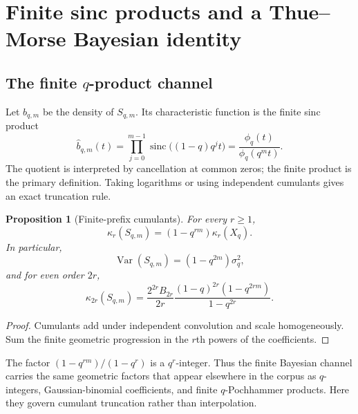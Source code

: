 \documentclass[11pt,oneside]{article}
\newtheorem{proposition}[theorem]{Proposition}
\theoremstyle{definition}
\theoremstyle{remark}
\newcommand{\Var}{\operatorname{Var}}
\newcommand{\sinc}{\operatorname{sinc}}
\begin{document}
\section{Finite sinc products and a Thue--Morse Bayesian identity}
\label{sec:TM-channel}

\subsection{The finite $q$-product channel}

Let $b_{q,m}$ be the density of $S_{q,m}$.  Its characteristic function is the
finite sinc product
\begin{equation}
 \widehat b_{q,m}(t)
 =\prod_{j=0}^{m-1}\sinc\bigl((1-q)q^jt\bigr)
 =\frac{\phi_q(t)}{\phi_q(q^mt)}.
 \label{eq:finite-sinc}
\end{equation}
The quotient is interpreted by cancellation at common zeros; the finite product
is the primary definition.  Taking logarithms or using independent cumulants gives
an exact truncation rule.

\begin{proposition}[Finite-prefix cumulants]
\label{prop:prefix-cumulants}
For every $r\ge1$,
\begin{equation}
 \kappa_r(S_{q,m})=(1-q^{rm})\kappa_r(X_q).
 \label{eq:prefix-cumulants}
\end{equation}
In particular,
\begin{equation}
 \Var(S_{q,m})=(1-q^{2m})\sigma_q^2,
 \label{eq:prefix-var}
\end{equation}
and for even order $2r$,
\begin{equation}
 \kappa_{2r}(S_{q,m})
 =\frac{2^{2r}B_{2r}}{2r}
   \frac{(1-q)^{2r}(1-q^{2rm})}{1-q^{2r}}.
 \label{eq:prefix-Bernoulli}
\end{equation}
\end{proposition}

\begin{proof}
Cumulants add under independent convolution and scale homogeneously.  Sum the
finite geometric progression in the $r$th powers of the coefficients.
\end{proof}

The factor $(1-q^{rm})/(1-q^r)$ is a $q^r$-integer.  Thus the finite Bayesian
channel carries the same geometric factors that appear elsewhere in the corpus as
$q$-integers, Gaussian-binomial coefficients, and finite $q$-Pochhammer products.
Here they govern cumulant truncation rather than interpolation.
\end{document}

